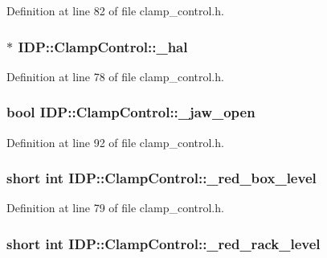 Definition at line 82 of file clamp\_\-control.h.

\hypertarget{classIDP_1_1ClampControl_ac0c31fdbef30bc0c0d729843c8874475}{
\subsubsection[{\_\-hal}]{$\ast$ {\bf IDP::ClampControl::\_\-hal}}}
\label{classIDP_1_1ClampControl_ac0c31fdbef30bc0c0d729843c8874475}


Definition at line 78 of file clamp\_\-control.h.

\hypertarget{classIDP_1_1ClampControl_a07bfb23f284fb25dacd0d22e5f218375}{
\subsubsection[{\_\-jaw\_\-open}]{\setlength{\rightskip}{0pt plus 5cm}bool {\bf IDP::ClampControl::\_\-jaw\_\-open}}}
\label{classIDP_1_1ClampControl_a07bfb23f284fb25dacd0d22e5f218375}


Definition at line 92 of file clamp\_\-control.h.

\hypertarget{classIDP_1_1ClampControl_ad6188d015d2f9f237abc81574715f6f6}{
\subsubsection[{\_\-red\_\-box\_\-level}]{\setlength{\rightskip}{0pt plus 5cm}short int {\bf IDP::ClampControl::\_\-red\_\-box\_\-level}}}
\label{classIDP_1_1ClampControl_ad6188d015d2f9f237abc81574715f6f6}


Definition at line 79 of file clamp\_\-control.h.

\hypertarget{classIDP_1_1ClampControl_ac9d8d3c77082aa750ddb98b32596f636}{
\subsubsection[{\_\-red\_\-rack\_\-level}]{\setlength{\rightskip}{0pt plus 5cm}short int {\bf IDP::ClampControl::\_\-red\_\-rack\_\-level}}}
\label{classIDP_1_1ClampControl_ac9d8d3c77082aa750ddb98b32596f636}


